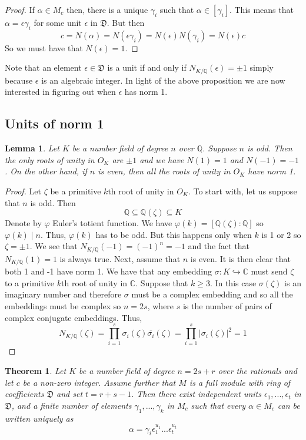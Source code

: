 \documentclass{article}
\newtheorem{theorem}{Theorem}[section]
\newtheorem{lemma}{Lemma}[section]
\newcommand{\mfrak}[1]{\mathfrak{#1}}
\newcommand{\mbb}[1]{\mathbb{#1}}
\numberwithin{equation}{section}
\begin{document}
\begin{proof}
	If $\alpha \in M_c$ then, there is a unique $\gamma_i$ such that $\alpha \in [\gamma_i]$. This means that $\alpha = \epsilon \gamma_i$ for some unit $\epsilon$ in $\mfrak D$. But then $$c = N(\alpha) = N(\epsilon \gamma_i) = N(\epsilon)N(\gamma_i) = N(\epsilon)c$$
	So we must have that $N(\epsilon) = 1$.
\end{proof}
Note that an element $\epsilon \in \mfrak D$ is a unit if and only if $N_{K/\mbb Q}(\epsilon) = \pm 1$ simply because $\epsilon$ is an algebraic integer. In light of the above proposition we are now interested in figuring out when $\epsilon$ has norm 1.

\subsection{Units of norm 1}

\begin{lemma}\label{lem: norm of primitive roots}
	Let $K$ be a number field of degree $n$ over $\mbb Q$. Suppose $n$ is odd. Then the only roots of unity in $O_K$ are $\pm 1$ and we have $N(1) = 1$ and $N(-1) = -1$. On the other hand, if $n$ is even, then all the roots of unity in $O_K$ have norm 1.
\end{lemma}
\begin{proof}
	Let $\zeta$ be a primitive $k$th root of unity in $O_K$. To start with, let us suppose that $n$ is odd. Then
	$$\mbb Q \subseteq \mbb Q(\zeta) \subseteq K$$
	Denote by $\varphi$ Euler's totient function. We have $\varphi(k) = [\mbb Q(\zeta) : \mbb Q]$ so $\varphi(k) \mid n$. Thus, $\varphi(k)$ has to be odd. But this happens only when $k$ is 1 or 2 so $\zeta = \pm 1$. We see that $N_{K/\mbb Q}(-1) = (-1)^n = -1$ and the fact that $N_{K / \mbb Q}(1) = 1$ is always true. Next, assume that $n$ is even. It is then clear that both 1 and -1 have norm 1. We have that any embedding $\sigma : K \hookrightarrow \mbb C$ must send $\zeta$ to a primitive $k$th root of unity in $\mbb C$. Suppose that $k \geq 3$. In this case $\sigma(\zeta)$ is an imaginary number and therefore $\sigma$ must be a complex embedding and so all the embeddings must be complex so $n = 2s$, where $s$ is the number of pairs of complex conjugate embeddings. Thus,
	$$N_{K /\mbb Q}(\zeta)  = \prod_{i=1}^s \sigma_i(\zeta) \overline{\sigma_i}(\zeta) = \prod_{i=1}^s |\sigma_i(\zeta)|^2 = 1$$
\end{proof}


\begin{theorem}\label{thm: Shape of solutions to N(x) = c for x in full module}
	Let $K$ be a number field of degree $n = 2s + r$ over the rationals and let $c$ be a non-zero integer. Assume further that $M$ is a full module with ring of coefficients $\mfrak D$ and set $t = r+s-1$. Then there exist independent units $\epsilon_1, ..., \epsilon_t$ in $\mfrak D$, and a finite number of elements $\gamma_1, ..., \gamma_k$ in $M_c$ such that every $\alpha \in M_c$ can be written uniquely as
	$$\alpha = \gamma_i \epsilon_1^{u_1} ... \epsilon_t^{u_t}$$
\end{theorem}
\end{document}
